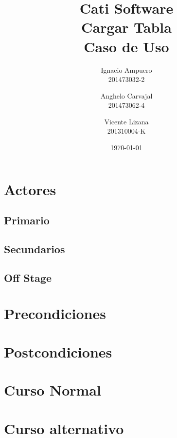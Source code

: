 \documentclass[fleqn]{article}
\title{\huge Cati Software\\ \Huge Cargar Tabla\\ \Large Caso de Uso \vspace{30pt}}
\author{Ignacio Ampuero\\ 201473032-2 \and Anghelo Carvajal\\ 201473062-4 \and Vicente Lizana\\ 201310004-K}
\date{\today}
\begin{document}
\maketitle
\vspace{30pt}

\section{Actores}

	\subsection{Primario}
	
	\subsection{Secundarios}
	
	\subsection{Off Stage}

\section{Precondiciones}

\section{Postcondiciones}

\section{Curso Normal}

\section{Curso alternativo}
\end{document}
